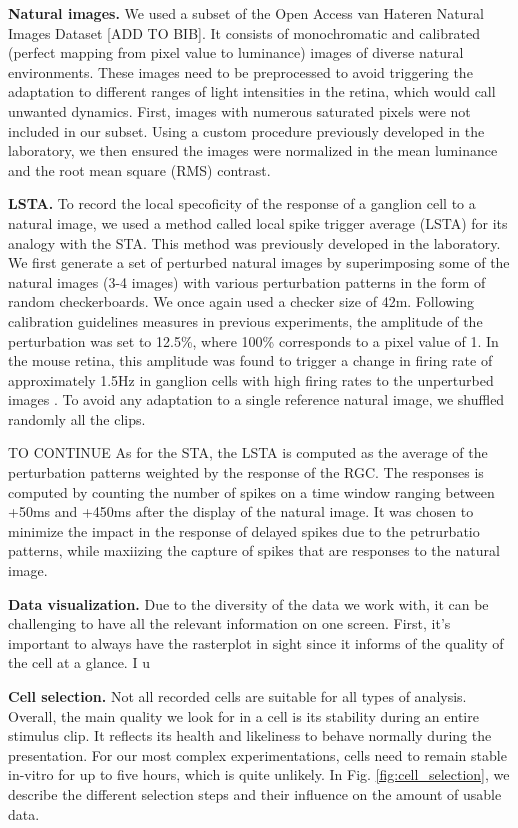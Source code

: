 \textbf{Natural images.}
We used a subset of the Open Access van Hateren Natural Images Dataset [ADD TO
        BIB]. It consists of monochromatic and calibrated (perfect mapping from
pixel
value to luminance) images of diverse natural environments. These images need
to
be preprocessed to avoid triggering the adaptation to different ranges of light
intensities in the retina, which would call unwanted
dynamics. First, images with numerous saturated pixels were not included in our
subset. Using a custom procedure previously developed in the laboratory, we
then
ensured the images were normalized in the mean luminance and the root mean
square (RMS) contrast.

\textbf{LSTA.}
To record the local specoficity of the response of a ganglion cell to a natural
image, we used a method called local spike trigger average (LSTA) for its
analogy with the STA. This method was previously developed in the laboratory.
We first generate a set of perturbed natural images by superimposing some of
the natural images (3-4 images) with various perturbation patterns in the form
of random checkerboards. We once again used a checker size of 42\textmu m.
Following calibration guidelines measures in previous experiments, the
amplitude of the perturbation was set to 12.5\%, where 100\% corresponds to a
pixel value of 1. In the mouse retina, this amplitude was found to trigger a
change in firing rate of approximately 1.5Hz in ganglion cells with high firing
rates to the unperturbed images \citep{goldin_context-dependent_2022}. To avoid any adaptation to a single reference natural image, we shuffled randomly all the clips.

TO CONTINUE
As for the STA, the LSTA is computed as the average of the perturbation patterns weighted by the response of the RGC. The responses is computed by counting the number of spikes on a time window ranging between +50ms and +450ms after the display of the natural image. It was chosen to minimize the impact in the response of delayed spikes due to the petrurbatio patterns, while maxiizing the capture of spikes that are responses to the natural image.

\textbf{Data visualization.}
Due to the diversity of the data we work with, it can be challenging to have
all the relevant information on one screen. First, it's important to always
have the rasterplot in sight since it informs of the quality of the cell at a
glance. I u

\textbf{Cell selection.}
Not all recorded cells are suitable for all types of analysis. Overall, the
main
quality we look for in a cell is its stability during an entire stimulus clip.
It reflects its health and likeliness to behave normally during the
presentation. For our most complex experimentations, cells need to remain
stable in-vitro for up to five hours, which is quite unlikely. In Fig. \ref{fig:cell_selection}, we
describe the different selection steps and their influence on the amount of
usable data.

